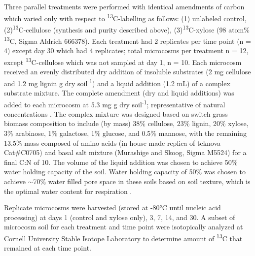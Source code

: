 Three parallel treatments were performed with identical amendments of carbon
which varied only with respect to \textsuperscript{13}C-labelling as follows:
(1) unlabeled control,(2)\textsuperscript{13}C-cellulose (synthesis and purity
described above), (3)\textsuperscript{13}C-xylose (98 atom\%
\textsuperscript{13}C, Sigma Aldrich 666378). Each treatment had 2 replicates
per time point (n = 4) except day 30 which had 4 replicates; total microcosms
per treatment n = 12, except \textsuperscript{13}C-cellulose which was not
sampled at day 1, n = 10. Each microcosm received an evenly distributed dry
addition of insoluble substrates (2 mg cellulose and 1.2 mg lignin g dry
soil\textsuperscript{-1}) and a liquid addition (1.2 mL) of a complex substrate
mixture. The complete amendment (dry and liquid additions) was added to each
microcosm at 5.3 mg g dry soil\textsuperscript{-1}; representative of natural
concentrations \cite{Schneckenberger_2008}. The complex mixture was designed
based on switch grass biomass composition \cite{Yan_2010,David_2010} to include
(by mass) 38\% cellulose, 23\% lignin, 20\% xylose, 3\% arabinose, 1\%
galactose, 1\% glucose, and 0.5\% mannose, with the remaining 13.5\% mass
composed of amino acids (in-house made replica of teknova Cat#C0705) and basal
salt mixture (Murashige and Skoog, Sigma M5524) for a final C:N of 10. The
volume of the liquid addition was chosen to achieve 50\% water holding capacity
of the soil. Water holding capacity of 50\% was chosen to achieve $\sim$70\%
water filled pore space in these soils based on soil texture, which is the
optimal water content for respiration \cite{Linn_1984,Linn_1984}.

Replicate microcosms were harvested (stored at -80°C until nucleic acid
processing) at days 1 (control and xylose only), 3, 7, 14, and 30. A subset of
microcosm soil for each treatment and time point were isotopically analyzed at
Cornell University Stable Isotope Laboratory to determine amount of
\textsuperscript{13}C that remained at each time point.   

